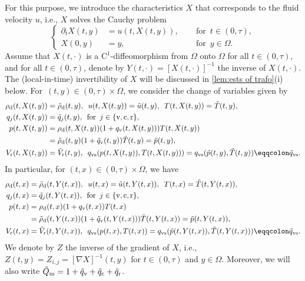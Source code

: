\documentclass[10pt]{amsart}
\theoremstyle{plain}
\theoremstyle{definition}
\theoremstyle{thm}
\numberwithin{equation}{section}
\newcommand{\rC}{\mathrm{C}}
\newcommand{\del}{\partial}
\newcommand{\tfor}{\enspace \text{for} \enspace}
\newcommand{\rd}{\mathrm{d}}
\renewcommand{\rm}{\mathrm{m}}
\newcommand{\rr}{\mathrm{r}}
\newcommand{\rv}{\mathrm{v}}
\newcommand{\rvs}{\mathrm{vs}}
\newcommand{\rc}{\mathrm{c}}
\newcommand{\trho}{\Tilde{\rho}}
\newcommand{\tu}{\Tilde{u}}
\newcommand{\tT}{\Tilde{T}}
\newcommand{\tq}{\Tilde{q}}
\newcommand{\tp}{\Tilde{p}}
\newcommand{\tV}{\Tilde{V}}
\newcommand{\tQ}{\Tilde{Q}}
\begin{document}
For this purpose, we introduce the characteristics $X$ that corresponds to the fluid velocity $u$, i.e., $X$ solves the Cauchy problem
\begin{equation}\label{eq:CP Lagrange}
    \left\{
    \begin{aligned}
        \del_t X(t,y)
        &= u(t,X(t,y)), &&\tfor t \in (0,\tau),\\
        X(0,y)
        &= y, &&\tfor y \in \Omega.
    \end{aligned}
    \right.
\end{equation}
Assume that $X(t,\cdot)$ is a $\rC^1$-diffeomorphism from $\Omega$ onto $\Omega$ for all $t \in (0,\tau)$, and for all $t \in (0,\tau)$, denote by $Y(t,\cdot) = [X(t,\cdot)]^{-1}$ the inverse of $X(t,\cdot)$.
The (local-in-time) invertibility of $X$ will be discussed in \autoref{lem:ests of trafo}(i) below.
For~$(t,y) \in (0,\tau) \times \Omega$, we consider the change of variables given by
\begin{equation*}
    \begin{aligned}
        \rho_\rd(t,X(t,y))
        &= \trho_\rd(t,y), \enspace u(t,X(t,y)) = \tu(t,y), \enspace T(t,X(t,y)) = \tT(t,y),\\
        q_j(t,X(t,y))
        &= \tq_j(t,y), \tfor j \in \{\rv,\rc,\rr\},\\
        p(t,X(t,y))
        &= \rho_\rd(t,X(t,y))(1 + q_\rv(t,X(t,y)))T(t,X(t,y))\\
        &= \trho_\rd(t,y)(1 + \tq_\rv(t,y))\tT(t,y) = \tp(t,y),\\
        V_\rr(t,X(t,y))
        &= \tV_\rr(t,y), \enspace q_\rvs(p(t,X(t,y)),T(t,X(t,y))) = q_\rvs(\tp(t,y),\tT(t,y)) \eqqcolon \tq_\rvs.
    \end{aligned}
\end{equation*}
In particular, for $(t,x) \in (0,\tau) \times \Omega$, we have
\begin{equation*}
    \begin{aligned}
        \rho_\rd(t,x)
        &= \trho_\rd(t,Y(t,x)), \enspace u(t,x) = \tu(t,Y(t,x)), \enspace T(t,x) = \tT(t,Y(t,x)),\\
        q_j(t,x)
        &= \tq_j(t,Y(t,x)), \tfor j \in \{\rv,\rc,\rr\},\\
        p(t,x)
        &= \rho_\rd(t,x)(1 + q_\rv(t,x))T(t,x)\\ 
        &= \trho_\rd(t,Y(t,x))(1 + \tq_\rv(t,Y(t,x)))\tT(t,Y(t,x))= \tp(t,Y(t,x)),\\
        V_\rr(t,x)
        &= \tV_\rr(t,Y(t,x)), \enspace q_\rvs(p(t,x),T(t,x)) = q_\rvs(\tp(t,Y(t,x)),\tT(t,Y(t,x))) \eqqcolon \tq_\rvs.
    \end{aligned}
\end{equation*}
We denote by $Z$ the inverse of the gradient of $X$, i.e., $Z(t,y) = Z_{i,j} = [\nabla X]^{-1}(t,y)$ for $t \in (0,\tau)$ and $y \in \Omega$.
Moreover, we will also write $\tQ_\rm = 1 + \tq_\rv + \tq_\rc + \tq_\rr$.
\end{document}
